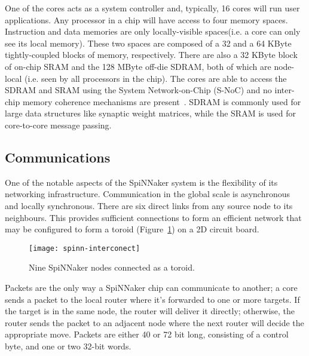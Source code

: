 One of the cores acts as a system controller and, typically, 16 cores will run user applications. Any processor in a chip will have access to four memory spaces. Instruction and data memories are only locally-visible spaces(i.e. a core can only see its local memory). These two spaces are composed of a 32 and a 64 KByte tightly-coupled blocks of memory, respectively. There are also a 32 KByte block of on-chip SRAM and the 128 MByte off-die SDRAM, both of which are node-local (i.e. seen by all processors in the chip). The cores are able to access the SDRAM and SRAM using the System Network-on-Chip (S-NoC) and no inter-chip memory coherence mechanisms are present~\cite{furber2013overview}. SDRAM is commonly used for large data structures like synaptic weight matrices, while the SRAM is used for core-to-core message passing.

\subsection{Communications}

One of the notable aspects of the SpiNNaker system is the flexibility of its networking infrastructure. Communication in the global scale is asynchronous and locally synchronous. There are six direct links from any source node to its neighbours. This provides sufficient connections to form an efficient network that may be configured to form a toroid (Figure~\ref{fig:hw:spinn-toroid}) on a 2D circuit board.

\begin{figure}[h]
  \begin{center}
    \texttt{[image: spinn-interconect]}
    \caption{Nine SpiNNaker nodes connected as a toroid.}
    \label{fig:hw:spinn-toroid}
  \end{center}
\end{figure}

Packets are the only way a SpiNNaker chip can communicate to another; a core sends a packet to the local router where it's forwarded to one or more targets. If the target is in the same node, the router will deliver it directly; otherwise, the router sends the packet to an adjacent node where the next router will decide the appropriate move. Packets are either 40 or 72 bit long, consisting of a control byte, and one or two 32-bit words.

